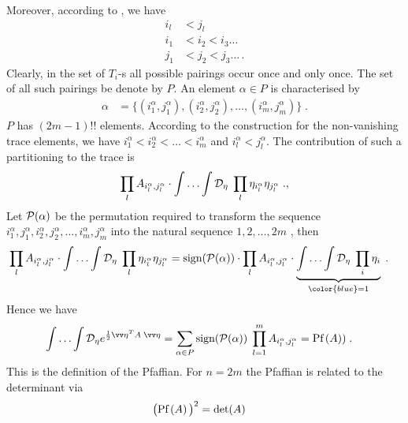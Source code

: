 %
Moreover, according to , we have 
%
\begin{align*}
i_{l}&< j_{l}\\
i_{1}&<i_{2}<i_{3}\ldots\\
j_{1}&<j_{2}<j_{3}\ldots\,.
\end{align*}
%
Clearly, in the set of $T_{i}$-s all possible pairings occur once and only once. 
%
The set of all such pairings be denote by $P$. An element $\alpha\in P$ is characterised by
%
\begin{align*}
\alpha &= \{(i^{\alpha}_{1},j^{\alpha}_{1}),(i^{\alpha}_{2},j^{\alpha}_{2}),\ldots,(i^{\alpha}_{m},j^{\alpha}_{m})\}\;.
\end{align*}
%
$P$ has $(2m-1)!!$ elements. According to the construction for the non-vanishing trace elements,
we have $i^{\alpha}_{1}< i^{\alpha}_{2}<\ldots < i^{\alpha}_{m}$  and $i^{\alpha}_{l}< j^{\alpha}_{l}$. The contribution of such a partitioning to the trace is
%
\begin{align*}
\prod_{l} A_{i^{\alpha}_{l},j^{\alpha}_{l}} \cdot \int\ldots\int {\cal D}_{\eta} \;\prod_{l} \eta_{i^{\alpha}_{l}}\eta_{j^{\alpha}_{l}}\;.,
\end{align*}
%
Let ${\cal P} (\alpha)$ be the permutation required to transform 
the sequence $i^{\alpha}_{1},j^{\alpha}_{1},i^{\alpha}_{2},j^{\alpha}_{2},\ldots,i^{\alpha}_{m},j^{\alpha}_{m}$ into the natural  sequence $1,2,\ldots,2m$ , then
%
\begin{align*}
\prod_{l} A_{i^{\alpha}_{l},j^{\alpha}_{l}} \cdot \int\ldots\int \Deta \;\prod_{l} \eta_{i^{\alpha}_{l}}\eta_{j^{\alpha}_{l}} &=\text{sign} (\cP (\alpha))\cdot 
\prod_{l} A_{i^{\alpha}_{l},j^{\alpha}_{l}}  \cdot \underbrace{
\int\ldots\int \Deta \;\prod_{i} \eta_{i}
}_{\color{blue} = 1}\;.
\end{align*}
%
Hence we have
\begin{align}\label{eq:gaussian:II:C}
\int\ldots\int \Deta  e^{\frac{1}{2}\vv\eta^{T} A \;\vv \eta}
&= \sum_{\alpha\in P}  
\text{sign} (\cP (\alpha))\;
\prod_{l=1}^{m} A_{i^{\alpha}_{l},j^{\alpha}_{l}} = \Pf{A})\;.
\end{align}
This is the definition of the Pfaffian. For $n=2m$ the Pfaffian is related to the determinant
via
%
\begin{align*}
\big(\text{Pf}\left(A\right)\big)^{2} &= \det(A)
\end{align*}
%


